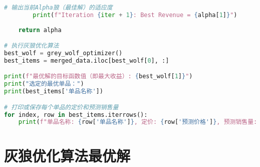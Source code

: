 \documentclass[withoutpreface,bwprint]{cumcmthesis} %
\begin{document}
\begin{lstlisting}[language=python]
        # 输出当前Alpha狼（最佳解）的适应度
        print(f"Iteration {iter + 1}: Best Revenue = {alpha[1]}")
    
    return alpha

# 执行灰狼优化算法
best_wolf = grey_wolf_optimizer()
best_items = merged_data.iloc[best_wolf[0], :]

print(f"最优解的目标函数值（即最大收益）: {best_wolf[1]}")
print("选定的最优单品：")
print(best_items['单品名称'])

# 打印或保存每个单品的定价和预测销售量
for index, row in best_items.iterrows():
    print(f"单品名称: {row['单品名称']}, 定价: {row['预测价格']}, 预测销售量: {row['预测销量']}")
 \end{lstlisting}
\section{灰狼优化算法最优解}
\end{document}
